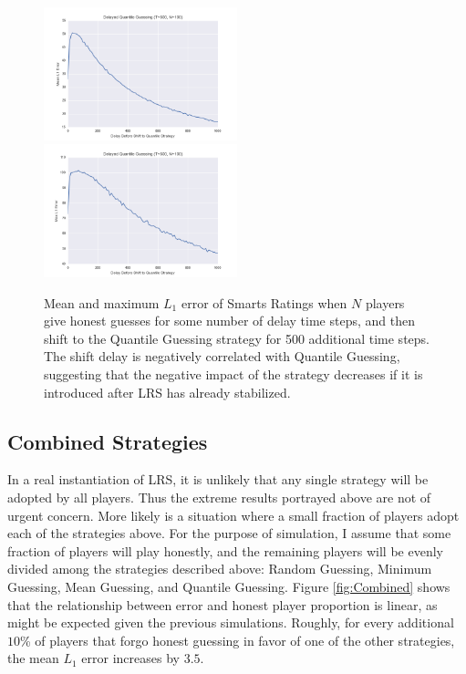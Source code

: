 \begin{figure}[H]
\centerline{%
\includegraphics[width=0.5\textwidth]{figures/robustness/Delayed_Quantile_Guessing41.png}%
\includegraphics[width=0.5\textwidth] {figures/robustness/Delayed_Quantile_Guessing42.png}%
}%
\caption{Mean and maximum $L_1$ error of Smarts Ratings when $N$ players give honest guesses for some number of delay time steps, and then shift to the Quantile Guessing strategy for 500 additional time steps. The shift delay is negatively correlated with Quantile Guessing, suggesting that the negative impact of the strategy decreases if it is introduced after LRS has already stabilized.}
\label{fig:QuantileGuessDelay}
\end{figure}

\subsection{Combined Strategies}

In a real instantiation of LRS, it is unlikely that any single strategy will be adopted by all players. Thus the extreme results portrayed above are not of urgent concern. More likely is a situation where a small fraction of players adopt each of the strategies above. For the purpose of simulation, I assume that some fraction of players will play honestly, and the remaining players will be evenly divided among the strategies described above: Random Guessing, Minimum Guessing, Mean Guessing, and Quantile Guessing. Figure \ref{fig:Combined} shows that the relationship between error and honest player proportion is linear, as might be expected given the previous simulations. Roughly, for every additional $10$\% of players that forgo honest guessing in favor of one of the other strategies, the mean $L_1$ error increases by $3.5$.

